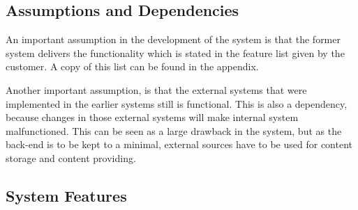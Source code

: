 \subsection{Assumptions and Dependencies}

An important assumption in the development of the system is that the former system delivers the functionality which is stated in the feature list given by the customer. A copy of this list can be found in the appendix.

\noindent

Another important assumption, is that the external systems that were implemented in the earlier systems still is functional. This is also a dependency, because changes in those external systems will make internal system malfunctioned. This can be seen as a large drawback in the system, but as the back-end is to be kept to a minimal, external sources have to be used for content storage and content providing.

\subsection{System Features}

\clearpage

